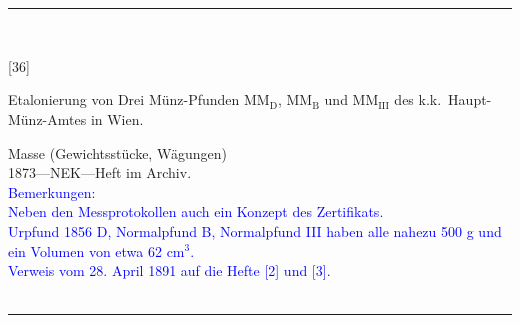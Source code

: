 \\
\vspace*{-2.5pt}\\
\parbox{\textwidth}{%
\rule{\textwidth}{1pt}\vspace*{-3mm}\\
\begin{minipage}[t]{0.15\textwidth}\vspace{0pt}
\Huge\rule[-4mm]{0cm}{1cm}[36]
\end{minipage}
\hfill
\begin{minipage}[t]{0.85\textwidth}\vspace{0pt}
\large Etalonierung von Drei Münz-Pfunden MM$_\mathrm{D}$, MM$_\mathrm{B}$ und MM$_\mathrm{III}$ des k.k.\ Haupt-Münz-Amtes in Wien.\rule[-2mm]{0mm}{2mm}
\end{minipage}
{\footnotesize\flushright
Masse (Gewichtsstücke, Wägungen)\\
}
1873\quad---\quad NEK\quad---\quad Heft im Archiv.\\
\textcolor{blue}{Bemerkungen:\\{}
Neben den Messprotokollen auch ein Konzept des Zertifikats.\\{}
Urpfund 1856 D, Normalpfund B, Normalpfund III haben alle nahezu 500 g und ein Volumen von etwa 62 cm$^3$.\\{}
Verweis vom 28. April 1891 auf die Hefte [2] und [3].\\{}
}
\\[-15pt]
\rule{\textwidth}{1pt}
}
\\
\vspace*{-2.5pt}\\
